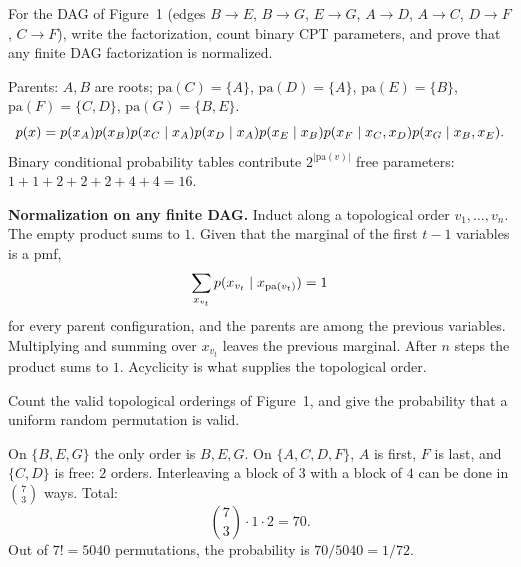 \begin{hwqbox}
For the DAG of Figure~1 (edges $B\to E$, $B\to G$, $E\to G$, $A\to D$, $A\to C$, $D\to F$, $C\to F$), write the factorization, count binary CPT parameters, and prove that any finite DAG factorization is normalized.
\end{hwqbox}
\begin{hwsolbox}
Parents: $A,B$ are roots; $\mathrm{pa}(C)=\{A\}$, $\mathrm{pa}(D)=\{A\}$, $\mathrm{pa}(E)=\{B\}$, $\mathrm{pa}(F)=\{C,D\}$, $\mathrm{pa}(G)=\{B,E\}$.
\[
p(x)=p(x_A)p(x_B)p(x_C\mid x_A)p(x_D\mid x_A)p(x_E\mid x_B)p(x_F\mid x_C,x_D)p(x_G\mid x_B,x_E).
\]
Binary conditional probability tables contribute $2^{|\mathrm{pa}(v)|}$ free parameters: $1+1+2+2+2+4+4=16$.

\textbf{Normalization on any finite DAG.} Induct along a topological order $v_1,\ldots,v_n$. The empty product sums to $1$. Given that the marginal of the first $t-1$ variables is a pmf,
\[
\sum_{x_{v_t}}p(x_{v_t}\mid x_{\mathrm{pa}(v_t)})=1
\]
for every parent configuration, and the parents are among the previous variables. Multiplying and summing over $x_{v_t}$ leaves the previous marginal. After $n$ steps the product sums to $1$. Acyclicity is what supplies the topological order.
\end{hwsolbox}

\begin{hwqbox}
Count the valid topological orderings of Figure~1, and give the probability that a uniform random permutation is valid.
\end{hwqbox}
\begin{hwsolbox}
On $\{B,E,G\}$ the only order is $B,E,G$. On $\{A,C,D,F\}$, $A$ is first, $F$ is last, and $\{C,D\}$ is free: $2$ orders. Interleaving a block of $3$ with a block of $4$ can be done in $\binom{7}{3}$ ways. Total:
\[
\binom{7}{3}\cdot 1\cdot 2=70.
\]
Out of $7!=5040$ permutations, the probability is $70/5040=1/72$.
\end{hwsolbox}

